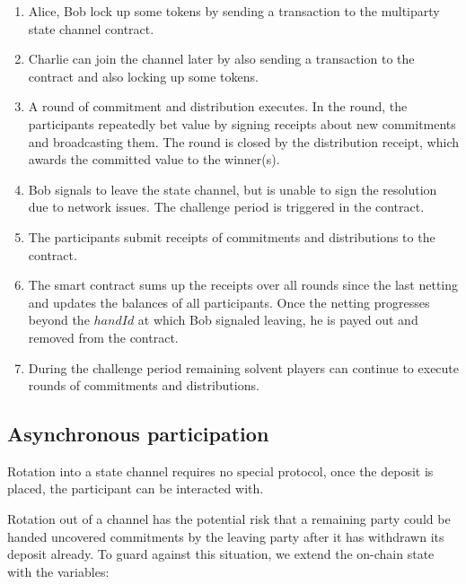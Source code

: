 \begin{enumerate}
\item Alice, Bob lock up some tokens by sending a transaction to the multiparty state channel contract.
\item Charlie can join the channel later by also sending a transaction to the contract and also locking up some tokens.
\item A round of commitment and distribution executes. In the round, the participants repeatedly bet value by signing receipts about new commitments and broadcasting them. The round is  closed by the distribution receipt, which awards the committed value to the winner(s).
\item Bob signals to leave the state channel, but is unable to sign the resolution due to network issues. The challenge period is triggered in the contract.
\item The participants submit receipts of commitments and distributions to the contract.
\item The smart contract sums up the receipts over all rounds since the last netting and updates the balances of all participants. Once the netting progresses beyond the \(handId\) at which Bob signaled leaving, he is payed out and removed from the contract.
\item During the challenge period remaining solvent players can continue to execute rounds of commitments and distributions.
\end{enumerate}

\subsection{Asynchronous participation}

Rotation into a state channel requires no special protocol, once the deposit is placed, the participant can be interacted with.

Rotation out of a channel has the potential risk that a remaining party could be handed uncovered commitments by the leaving party after it has withdrawn its deposit already. To guard against this situation, we extend the on-chain state with the variables:


